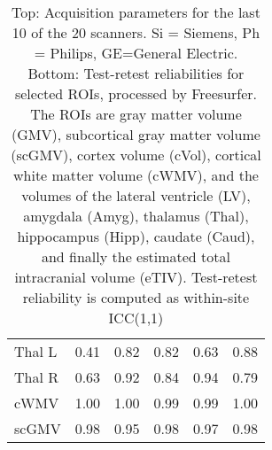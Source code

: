 \begin{table}
\begin{tabular}{llllll}
Thal L                &               0.41 &               0.82 &               0.82 &                                               0.63 &               0.88 \\
Thal R                &               0.63 &               0.92 &               0.84 &                                               0.94 &               0.79 \\
cWMV                  &               1.00 &               1.00 &               0.99 &                                               0.99 &               1.00 \\
scGMV                 &               0.98 &               0.95 &               0.98 &                                               0.97 &               0.98 \\
\bottomrule
\end{tabular}
\caption{Top: Acquisition parameters for the last 10 of the 20 scanners. Si = Siemens, Ph = Philips, GE=General Electric. Bottom: Test-retest reliabilities for selected ROIs, processed by Freesurfer. The ROIs are gray matter volume (GMV), subcortical gray matter volume (scGMV), cortex volume (cVol), cortical white matter volume (cWMV), and the volumes of the lateral ventricle (LV), amygdala (Amyg), thalamus (Thal), hippocampus (Hipp), caudate (Caud), and finally the estimated total intracranial volume (eTIV). Test-retest reliability is computed as within-site ICC(1,1)} 
\label{tab:acquisition2}

\end{table}